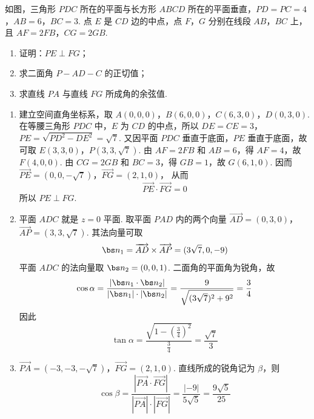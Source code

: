 \begin{problem}
如图，三角形 \(PDC\) 所在的平面与长方形 \(ABCD\) 所在的平面垂直，\(PD = PC = 4\)，\(AB = 6\)，\(BC = 3\). 点 \(E\) 是 \(CD\) 边的中点，点 \(F\)，\(G\) 分别在线段 \(AB\)，\(BC\) 上，且 \(AF = 2FB\)，\(CG = 2GB\).

\begin{enumerate}
\item 证明：\(PE \perp FG\)；
\item 求二面角 \(P - AD - C\) 的正切值；
\item 求直线 \(PA\) 与直线 \(FG\) 所成角的余弦值.
\end{enumerate}

\begin{center}
\end{center}
\end{problem}

\begin{solution}
\begin{enumerate}
\item 建立空间直角坐标系，取
\(A(0,0,0)\)，\(B(6,0,0)\)，\(C(6,3,0)\)，\(D(0,3,0)\).
在等腰三角形 \(PDC\) 中，\(E\) 为 \(CD\) 的中点，所以
\(DE=CE=3\)，\(PE=\sqrt{PD^2-DE^2}=\sqrt7\).
又因平面 \(PDC\) 垂直于底面，\(PE\) 垂直于底面，故可取
\(E(3,3,0)\)，\(P(3,3,\sqrt7)\).
由 \(AF=2FB\) 和 \(AB=6\)，得 \(AF=4\)，故 \(F(4,0,0)\). 由 \(CG=2GB\) 和 \(BC=3\)，得 \(GB=1\)，故 \(G(6,1,0)\). 因而
\(\overrightarrow{PE}=(0,0,-\sqrt7)\)，\(\overrightarrow{FG}=(2,1,0)\)，
从而
\[
\overrightarrow{PE}\cdot\overrightarrow{FG}=0
\]
所以 \(PE\perp FG\).
\item 平面 \(ADC\) 就是 \(z=0\) 平面. 取平面 \(PAD\) 内的两个向量
\(\overrightarrow{AD}=(0,3,0)\)，\(\overrightarrow{AP}=(3,3,\sqrt7)\).
其法向量可取
\[
\bs n_1=\overrightarrow{AD}\times\overrightarrow{AP}
=(3\sqrt7,0,-9)
\]
平面 \(ADC\) 的法向量取 \(\bs n_2=(0,0,1)\). 二面角的平面角为锐角，故
\[
\cos\alpha=\frac{|\bs n_1\cdot\bs n_2|}{|\bs n_1|\cdot|\bs n_2|}
=\frac{9}{\sqrt{(3\sqrt7)^2+9^2}}=\frac34
\]
因此
\[
\tan\alpha=\frac{\sqrt{1-\left(\frac34\right)^2}}{\frac34}
=\frac{\sqrt7}{3}
\]
\item
\(\overrightarrow{PA}=(-3,-3,-\sqrt7)\)，\(\overrightarrow{FG}=(2,1,0)\).
直线所成的锐角记为 \(\beta\)，则
\[
\cos\beta
=\frac{|\overrightarrow{PA}\cdot\overrightarrow{FG}|}{|\overrightarrow{PA}|\cdot|\overrightarrow{FG}|}
=\frac{|-9|}{5\sqrt5}
=\frac{9\sqrt5}{25}
\]
\end{enumerate}
\end{solution}

